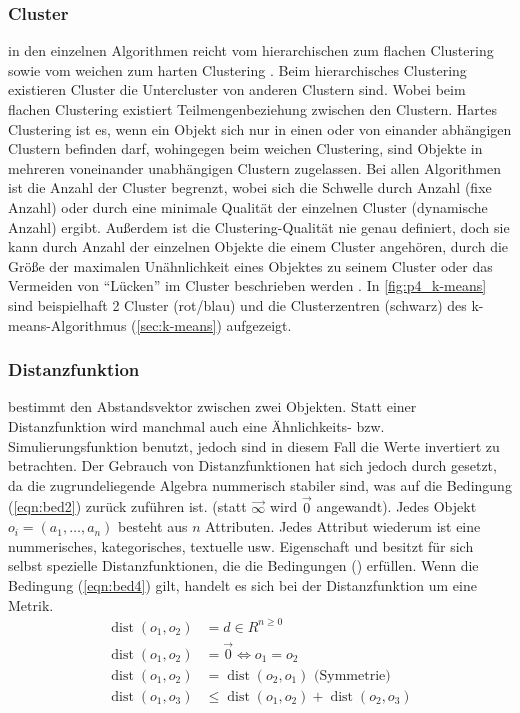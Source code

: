 \documentclass[12pt,journal,compsoc,ngerman]{IEEEtran}
\DeclareMathOperator{\dist}{dist}
\begin{document}
\subsubsection{Cluster} \label{sec:cluster}


 in den einzelnen Algorithmen reicht vom hierarchischen zum flachen Clustering sowie vom weichen zum harten Clustering \cite{ester2000knowledge}. Beim hierarchisches Clustering existieren Cluster die Untercluster von anderen Clustern sind. Wobei beim flachen Clustering existiert Teilmengenbeziehung zwischen den Clustern. Hartes Clustering ist es, wenn ein Objekt sich nur in einen oder von einander abhängigen Clustern befinden darf, wohingegen beim weichen Clustering, sind Objekte in mehreren voneinander unabhängigen Clustern zugelassen. Bei allen Algorithmen ist die Anzahl der Cluster begrenzt, wobei sich die Schwelle durch Anzahl (fixe Anzahl) oder durch eine minimale Qualität der einzelnen Cluster (dynamische Anzahl) ergibt. Außerdem ist die Clustering-Qualität nie genau definiert, doch sie kann durch Anzahl der einzelnen Objekte die einem Cluster angehören, durch die Größe der maximalen Unähnlichkeit eines Objektes zu seinem Cluster oder das Vermeiden von \enquote{Lücken} im Cluster beschrieben werden \cite{dwh}. In \cref{fig:p4_k-means} sind beispielhaft 2 Cluster (rot/blau) und die Clusterzentren (schwarz) des k-means-Algorithmus (\cref{sec:k-means}) aufgezeigt.

\pagebreak
\subsubsection{Distanzfunktion}\label{sec:distanzfunktion}
 bestimmt den Abstandsvektor zwischen zwei Objekten. Statt einer Distanzfunktion wird manchmal auch eine Ähnlichkeits- bzw. Simulierungsfunktion benutzt, jedoch sind in diesem Fall die Werte invertiert zu betrachten. Der Gebrauch von Distanzfunktionen hat sich jedoch durch gesetzt, da die zugrundeliegende Algebra nummerisch stabiler sind, was auf die Bedingung  (\cref{eqn:bed2}) zurück zuführen ist. (statt $\vec{\infty}$ wird $\vec{0}$ angewandt). Jedes Objekt $o_i = (a_1, \ldots, a_n)$ besteht aus $n$ Attributen. Jedes Attribut wiederum ist eine nummerisches, kategorisches, textuelle usw. Eigenschaft und besitzt für sich selbst spezielle Distanzfunktionen, die die Bedingungen () erfüllen. Wenn die Bedingung (\cref{eqn:bed4}) gilt, handelt es sich bei der Distanzfunktion um eine Metrik.
\begin{align}
\dist(o_1, o_2) &= d \in R^{n\geq 0} \label{eqn:bed1}\\
\dist(o_1, o_2) &= \vec{0} \Leftrightarrow o_1 = o_2 \label{eqn:bed2}\\
\dist(o_1, o_2) &= \dist(o_2, o_1) \mbox{ (Symmetrie)} \label{eqn:bed3}\\
\dist(o_1, o_3) &\leq \dist(o_1, o_2) + \dist(o_2, o_3) \label{eqn:bed4}
\end{align} 
\end{document}
